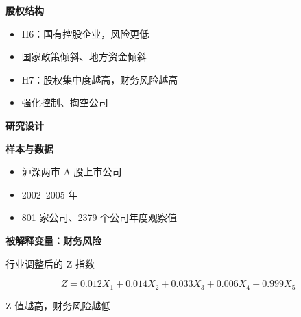 \documentclass[aspectratio=169,UTF8,zihao=-4]{ctexbeamer}
\newcommand{\bigidea}[1]{
  \begin{center}
    \vspace{0.8em}
    {\LARGE \bfseries #1}
    \vspace{0.6em}
  \end{center}
}
\newcommand{\sectionpageframe}[1]{
  \begin{frame}[plain]
    \begin{center}
      \vfill
      {\Huge \bfseries #1}
      \vfill
    \end{center}
  \end{frame}
}
\begin{document}
\begin{frame}
  \bigidea{股权结构}
  \begin{itemize}
    \item \Large H6：国有控股企业，风险更低
    \item \Large 国家政策倾斜、地方资金倾斜
    \item \Large H7：股权集中度越高，财务风险越高
    \item \Large 强化控制、掏空公司
  \end{itemize}
\end{frame}

\sectionpageframe{研究设计}

\begin{frame}
  \bigidea{样本与数据}
  \begin{itemize}
    \item \Large 沪深两市 A 股上市公司
    \item \Large 2002--2005 年
    \item \Large 801 家公司、2379 个公司年度观察值
  \end{itemize}
\end{frame}

\begin{frame}
  \bigidea{被解释变量：财务风险}
  \begin{block}{行业调整后的 Z 指数}
  \begin{center}
    {\Large
    \[
      Z = 0.012X_1 + 0.014X_2 + 0.033X_3 + 0.006X_4 + 0.999X_5
    \]
    }
  \end{center}
  \end{block}
  \begin{center}
    \Large Z 值越高，财务风险越低
  \end{center}
\end{frame}
\end{document}
